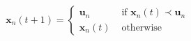 
\begin{equation}
\mathbf{x}_{n}(t+1)=\left\{\begin{array}{ll}{\mathbf{u}_{n}} & {\text { if } \mathbf{x}_{n}(t) \prec \mathbf{u}_{n}} \\ {\mathbf{x}_{n}(t)} & {\text { otherwise }}\end{array}\right.
\label{selection_constraint}
\end{equation}